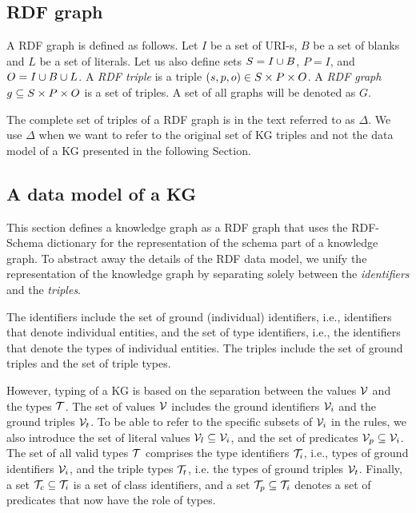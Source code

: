 \documentclass[runningheads]{llncs}
\newcommand{\V}{{\cal V}}
\newcommand{\T}{{\cal T}}
\begin{document}
\subsection{RDF graph\label{sec:kg}}

A RDF graph \cite{rdf} is defined as follows. Let $I$ be a set of
URI-s, $B$ be a set of blanks and $L$ be a set of literals. Let us
also define sets $S = I\cup\/B$, $P = I$, and $O = I\cup\/B\cup\/L$. A
\emph{RDF triple} is a triple $(s,p,o)\in\/S\times\/P\times\/O$. A
\emph{RDF graph} $g\subseteq\/S\times\/P\times\/O$ is a set of
triples. A set of all graphs will be denoted as $G$.

The complete set of triples of a RDF graph is in the text
referred to as $\Delta$. We use $\Delta$ when we want to refer
to the original set of KG triples and not the data model of a KG
presented in the following Section.






\subsection{A data model of a KG}

This section defines a knowledge graph as a RDF graph that uses the 
RDF-Schema dictionary \cite{rdfschema} for the representation of the
schema part of a knowledge graph. To abstract away the details of the
RDF data model, we unify the representation of the knowledge graph by
separating solely between the \emph{identifiers} and the
\emph{triples}.

The identifiers include the set of ground (individual) identifiers,
i.e., identifiers that denote individual entities, and the set of type
identifiers, i.e., the identifiers that denote the types of individual
entities. The triples include the set of ground triples and the set of
triple types.

However, typing of a KG is based on the separation between the values
$\V$ and the types $\T$. The set of values $\V$ includes the ground
identifiers $\V_i$ and the ground triples $\V_t$. To be able to refer
to the specific subsets of $\V_i$ in the rules, we also introduce the
set of literal values $\V_l\subseteq\V_i$, and the set of predicates
$\V_p\subseteq\V_i$. The set of all valid types $\T$ comprises the
type identifiers $\T_i$, i.e., types of ground identifiers $\V_i$, and
the triple types $\T_t$, i.e. the types of ground triples $\V_t$.
Finally, a set $\T_c\subseteq\T_i$ is a set of class identifiers, and
a set $\T_p\subseteq\T_i$ denotes a set of predicates that now have
the role of types.
\end{document}
